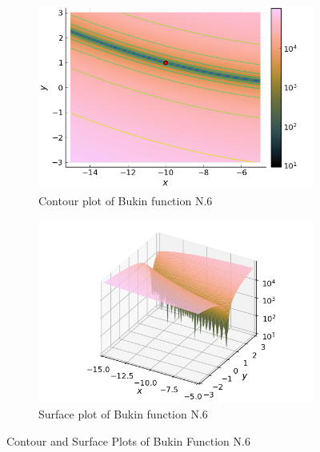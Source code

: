 \begin{figure}[ht!]
  \centering
  \begin{subfigure}[b]{0.4\textwidth}
    \centering
    \includegraphics[width=\textwidth]{img/test_functions/bukin_contour.png}
    \caption{Contour plot of Bukin function N.6}
    \label{fig:app:test:bukin:contour}
  \end{subfigure}
  \hfill
  \begin{subfigure}[b]{0.4\textwidth}
    \centering
    \includegraphics[width=\textwidth]{img/test_functions/bukin_surface.png}
    \caption{Surface plot of Bukin function N.6}
    \label{fig:app:test:bukin:surface}
  \end{subfigure}
  \caption{Contour and Surface Plots of Bukin Function N.6}
  \label{fig:app:test:bukin}
\end{figure}
